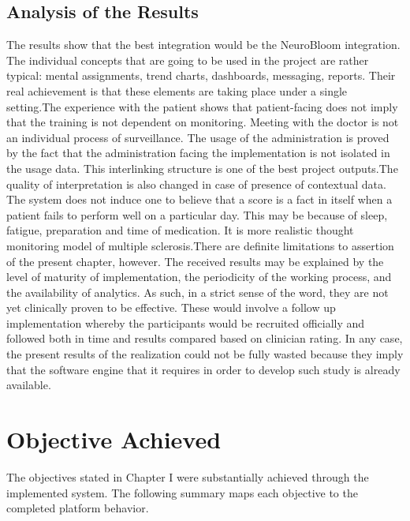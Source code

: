 \documentclass[12pt,a4paper]{report}
\begin{document}
\subsection{Analysis of the Results}
The results show that the best integration would be the NeuroBloom integration. The individual concepts that are going to be used in the project are rather typical: mental assignments, trend charts, dashboards, messaging, reports. Their real achievement is that these elements are taking place under a single setting.The experience with the patient shows that patient-facing does not imply that the training is not dependent on monitoring. Meeting with the doctor is not an individual process of surveillance. The usage of the administration is proved by the fact that the administration facing the implementation is not isolated in the usage data. This interlinking structure is one of the best project outputs.The quality of interpretation is also changed in case of presence of contextual data. The system does not induce one to believe that a score is a fact in itself when a patient fails to perform well on a particular day. This may be because of sleep, fatigue, preparation and time of medication. It is more realistic thought monitoring model of multiple sclerosis.There are definite limitations to assertion of the present chapter, however. The received results may be explained by the level of maturity of implementation, the periodicity of the working process, and the availability of analytics. As such, in a strict sense of the word, they are not yet clinically proven to be effective. These would involve a follow up implementation whereby the participants would be recruited officially and followed both in time and results compared based on clinician rating. In any case, the present results of the realization could not be fully wasted because they imply that the software engine that it requires in order to develop such study is already available.

\section{Objective Achieved}
The objectives stated in Chapter I were substantially achieved through the implemented system. The following summary maps each objective to the completed platform behavior.
\end{document}
